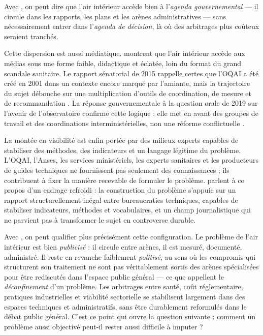 \documentclass[a4paper,12pt,twoside]{book}
\begin{document}
Avec \textcite{Kingdon1984Agendas}, on peut dire que l'air intérieur accède bien à l'\emph{agenda gouvernemental} --- il circule dans les rapports, les plans et les arènes administratives --- sans nécessairement entrer dans l'\emph{agenda de décision}, là où des arbitrages plus coûteux seraient tranchés.

Cette dispersion est aussi médiatique. \textcite{CrespinFerron2016ScandaleRecherchePublic} montrent que l'air intérieur accède aux médias sous une forme faible, didactique et éclatée, loin du format du grand scandale sanitaire. Le rapport sénatorial de 2015 rappelle certes que l'OQAI a été créé en 2001 dans un contexte encore marqué par l'amiante, mais la trajectoire du sujet débouche sur une multiplication d'outils de coordination, de mesure et de recommandation \parencite{Senat2015CoutInaction}. La réponse gouvernementale à la question orale de 2019 sur l'avenir de l'observatoire confirme cette logique : elle met en avant des groupes de travail et des coordinations interministérielles, non une réforme conflictuelle \parencite{QuestionAN2019OQAI}.

La montée en visibilité est enfin portée par des milieux experts capables de stabiliser des méthodes, des indicateurs et un langage légitime du problème. L'OQAI, l'Anses, les services ministériels, les experts sanitaires et les producteurs de guides techniques ne fournissent pas seulement des connaissances ; ils contribuent à fixer la manière recevable de formuler le problème. \textcite{FerronHourcadeLeBourhis2022ApproprierProblemeAirInterieur} parlent à ce propos d'un cadrage refroidi : la construction du problème s'appuie sur un rapport structurellement inégal entre bureaucraties techniques, capables de stabiliser indicateurs, méthodes et vocabulaires, et un champ journalistique qui ne parvient pas à transformer le sujet en controverse durable.

Avec \textcite{GilbertHenry2012ProblemesPublics}, on peut qualifier plus précisément cette configuration. Le problème de l'air intérieur est bien \emph{publicisé} : il circule entre arènes, il est mesuré, documenté, administré. Il reste en revanche faiblement \emph{politisé}, au sens où les compromis qui structurent son traitement ne sont pas véritablement sortis des arènes spécialisées pour être rediscutés dans l'espace public général --- ce que \textcite{GilbertHenry2012ProblemesPublics} appellent le \emph{déconfinement} d'un problème. Les arbitrages entre santé, coût réglementaire, pratiques industrielles et viabilité sectorielle se stabilisent largement dans des espaces techniques et administratifs, sans être durablement reformulés dans le débat public général. C'est ce point qui ouvre la question suivante : comment un problème aussi objectivé peut-il rester aussi difficile à imputer ?
\end{document}
